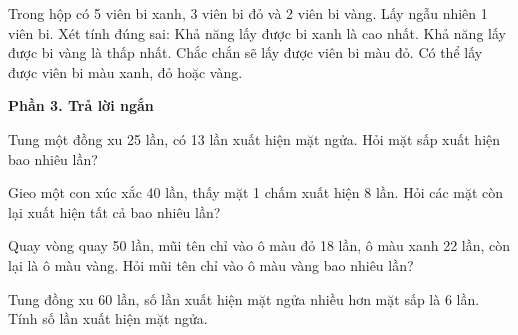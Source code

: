 \begin{ex} %
Trong hộp có 5 viên bi xanh, 3 viên bi đỏ và 2 viên bi vàng. Lấy ngẫu nhiên 1 viên bi. Xét tính đúng sai:
\choiceTF
{\True Khả năng lấy được bi xanh là cao nhất.}
{\True Khả năng lấy được bi vàng là thấp nhất.}
{Chắc chắn sẽ lấy được viên bi màu đỏ.}
{\True Có thể lấy được viên bi màu xanh, đỏ hoặc vàng.}
\end{ex}

\textbf{Phần 3. Trả lời ngắn}

\begin{ex} %
Tung một đồng xu 25 lần, có 13 lần xuất hiện mặt ngửa. Hỏi mặt sấp xuất hiện bao nhiêu lần?
\end{ex}

\begin{ex} %
Gieo một con xúc xắc 40 lần, thấy mặt 1 chấm xuất hiện 8 lần. Hỏi các mặt còn lại xuất hiện tất cả bao nhiêu lần?
\end{ex}

\begin{ex} %
Quay vòng quay 50 lần, mũi tên chỉ vào ô màu đỏ 18 lần, ô màu xanh 22 lần, còn lại là ô màu vàng. Hỏi mũi tên chỉ vào ô màu vàng bao nhiêu lần?
\end{ex}

\begin{ex} %
Tung đồng xu 60 lần, số lần xuất hiện mặt ngửa nhiều hơn mặt sấp là 6 lần. Tính số lần xuất hiện mặt ngửa.
\end{ex}

